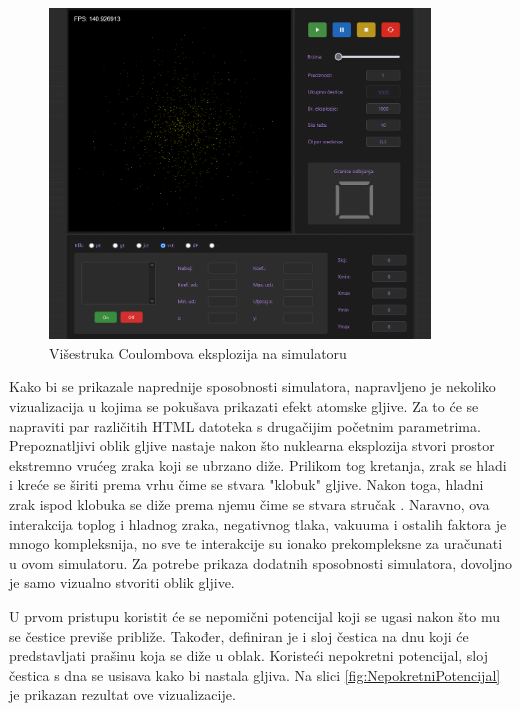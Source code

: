 \documentclass{foi}
\begin{document}
\begin{figure}[H]
    \centering
    \includegraphics[width=0.9\textwidth]{slike/25_VCESimulator.png}
    \captionsetup{justification=centering}
    \caption{Višestruka Coulombova eksplozija na simulatoru}
\label{fig:VCESimulator}
\end{figure}

Kako bi se prikazale naprednije sposobnosti simulatora, napravljeno je nekoliko vizualizacija u kojima se pokušava prikazati efekt atomske gljive. Za to će se napraviti par različitih HTML datoteka s drugačijim početnim parametrima. Prepoznatljivi oblik gljive nastaje nakon što nuklearna eksplozija stvori prostor ekstremno vrućeg zraka koji se ubrzano diže. Prilikom tog kretanja, zrak se hladi i kreće se širiti prema vrhu čime se stvara "klobuk" gljive. Nakon toga, hladni zrak ispod klobuka se diže prema njemu čime se stvara stručak \parencite{MushroomCloudBezDat}. Naravno, ova interakcija toplog i hladnog zraka, negativnog tlaka, vakuuma i ostalih faktora je mnogo kompleksnija, no sve te interakcije su ionako prekompleksne za uračunati u ovom simulatoru. Za potrebe prikaza dodatnih sposobnosti simulatora, dovoljno je samo vizualno stvoriti oblik gljive.

U prvom pristupu koristit će se nepomični potencijal koji se ugasi nakon što mu se čestice previše približe. Također, definiran je i sloj čestica na dnu koji će predstavljati prašinu koja se diže u oblak. Koristeći nepokretni potencijal, sloj čestica s dna se usisava kako bi nastala gljiva. Na slici \ref{fig:NepokretniPotencijal} je prikazan rezultat ove vizualizacije.
\end{document}
